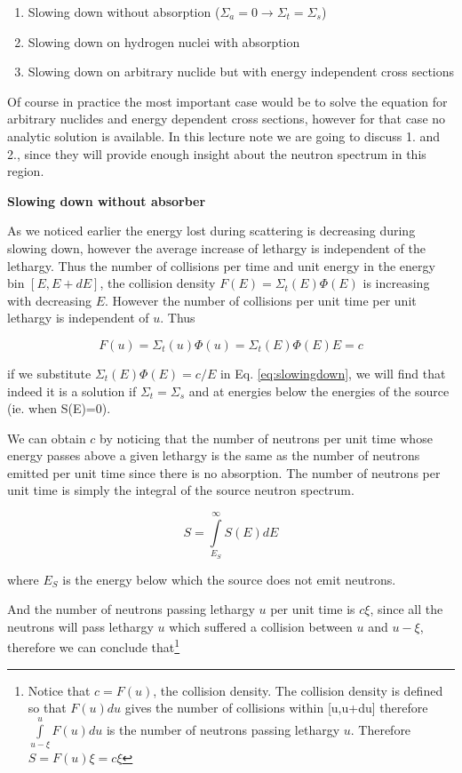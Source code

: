 \begin{enumerate}
\item Slowing down without absorption ($\Sigma_a=0 \rightarrow \Sigma_t=\Sigma_s$)
\item Slowing down on hydrogen nuclei with absorption
\item Slowing down on arbitrary nuclide but with energy independent cross sections
\end{enumerate}

Of course in practice the most important case would be to solve the equation for arbitrary nuclides and energy dependent cross sections, however for that case no analytic solution is available. In this lecture note we are going to discuss 1. and 2., since they will provide enough insight about the neutron spectrum in this region.

\vspace{0.5cm}

\textbf{Slowing down without absorber}

As we noticed earlier the energy lost during scattering is decreasing during slowing down, however the average increase of lethargy is independent of the lethargy. Thus the number of collisions per time and unit energy in the energy bin $[E,E+dE]$, the collision density $F(E)=\Sigma_t(E)\Phi(E)$ is increasing with decreasing $E$. However the number of collisions per unit time per unit lethargy is independent of $u$. Thus

$$F(u)=\Sigma_t(u)\Phi(u)=\Sigma_t(E)\Phi(E)E=c$$

\noindent if we substitute $\Sigma_t(E)\Phi(E)=c/E$ in Eq. \eqref{eq:slowingdown}, we will find that indeed it is a solution if $\Sigma_t=\Sigma_s$ and at energies below the energies of the source (ie. when S(E)=0).

We can obtain $c$ by noticing that the number of neutrons per unit time whose energy passes above a given lethargy is the same as the number of neutrons emitted per unit time since there is no absorption. The number of neutrons per unit time is simply the integral of the source neutron spectrum.

$$S=\int\limits_{E_S}^\infty S(E)dE$$

\noindent where $E_S$ is the energy below which the source does not emit neutrons. 

And the number of neutrons passing lethargy $u$ per unit time is $c\xi$, since all the neutrons will pass lethargy $u$ which suffered a collision between $u$ and $u-\xi$, therefore we can conclude that\footnote{Notice that $c=F(u)$, the collision density. The collision density is defined so that $F(u)du$ gives the number of collisions within [u,u+du] therefore $\int\limits_{u-\xi}^u F(u)du$ is the number of neutrons passing lethargy $u$. Therefore $S=F(u)\xi=c\xi$ }

